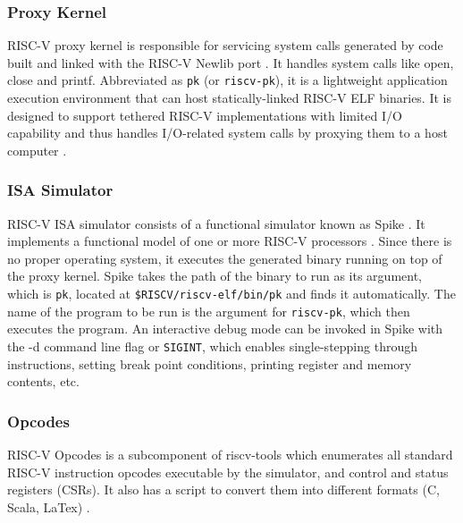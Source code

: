 \subsubsection{Proxy Kernel}
 \label{sect6_2_1_3}
RISC-V proxy kernel is responsible for servicing system calls generated by code built and linked with the RISC-V Newlib port \cite{riscv_soft_tools}. It handles system calls like open, close and printf. Abbreviated as \verb|pk| (or \verb|riscv-pk|), it is a lightweight application execution environment that can host statically-linked RISC-V ELF binaries. It is designed to support tethered RISC-V implementations with limited I/O capability and thus handles I/O-related system calls by proxying them to a host computer \cite{riscv_pk}.

\subsubsection{ISA Simulator}
 \label{sect6_2_1_4}
RISC-V ISA simulator consists of a functional simulator known as Spike \cite{riscv_soft_tools}. It implements a functional model of one or more RISC-V processors \cite{riscv_isa}. Since there is no proper operating system, it executes the generated binary running on top of the proxy kernel. \newline\newline
Spike takes the path of the binary to run as its argument, which is \verb|pk|, located at \verb|$RISCV/riscv-elf/bin/pk| and finds it automatically. The name of the program to be run is the argument for \verb|riscv-pk|, which then executes the program. An interactive debug mode can be invoked in Spike with the -d command line flag or \verb|SIGINT|, which enables single-stepping through instructions, setting break point conditions, printing register and memory contents, etc.

\subsubsection{Opcodes}
 \label{sect6_2_1_5}
RISC-V Opcodes is a subcomponent of riscv-tools which enumerates all standard RISC-V instruction opcodes executable by the simulator, and control and status registers (CSRs). It also has a script to convert them into different formats (C, Scala, LaTex) \cite{riscv_opcodes}.

